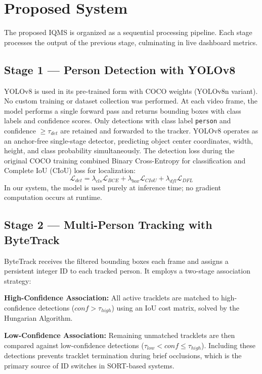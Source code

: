 \documentclass[journal, twocolumn]{IEEEtran}
\begin{document}
\section{Proposed System}
\label{sec:proposed}

The proposed IQMS is organized as a sequential processing pipeline. Each stage processes the output of the previous stage, culminating in live dashboard metrics.

\subsection{Stage 1 — Person Detection with YOLOv8}
YOLOv8 \cite{yolov8} is used in its pre-trained form with COCO weights (YOLOv8n variant). No custom training or dataset collection was performed. At each video frame, the model performs a single forward pass and returns bounding boxes with class labels and confidence scores. Only detections with class label \texttt{person} and confidence $\geq \tau_{det}$ are retained and forwarded to the tracker. YOLOv8 operates as an anchor-free single-stage detector, predicting object center coordinates, width, height, and class probability simultaneously. The detection loss during the original COCO training combined Binary Cross-Entropy for classification and Complete IoU (CIoU) loss for localization:
\begin{equation}
\mathcal{L}_{det} = \lambda_{cls}\mathcal{L}_{BCE} + \lambda_{box}\mathcal{L}_{CIoU} + \lambda_{dfl}\mathcal{L}_{DFL}
\end{equation}
In our system, the model is used purely at inference time; no gradient computation occurs at runtime.

\subsection{Stage 2 — Multi-Person Tracking with ByteTrack}
ByteTrack \cite{bytetrack2022} receives the filtered bounding boxes each frame and assigns a persistent integer ID to each tracked person. It employs a two-stage association strategy:

\textbf{High-Confidence Association:} All active tracklets are matched to high-confidence detections ($conf > \tau_{high}$) using an IoU cost matrix, solved by the Hungarian Algorithm.

\textbf{Low-Confidence Association:} Remaining unmatched tracklets are then compared against low-confidence detections ($\tau_{low} < conf \leq \tau_{high}$). Including these detections prevents tracklet termination during brief occlusions, which is the primary source of ID switches in SORT-based systems.
\end{document}
